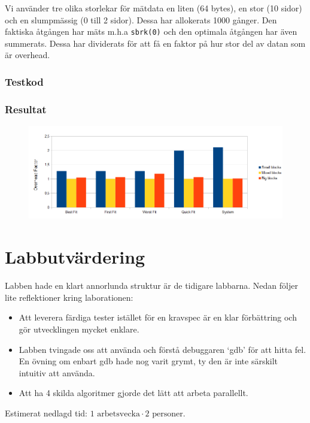 \documentclass[a4paper,10pt,titlepage]{article}
\begin{document}
Vi använder tre olika storlekar för mätdata en liten (64 bytes), en stor (10 sidor) och en slumpmässig (0 till 2 sidor). Dessa har allokerats 1000 gånger. Den faktiska åtgången har mäts m.h.a \texttt{sbrk(0)} och den optimala åtgången har även summerats. Dessa har dividerats för att få en faktor på hur stor del av datan som är overhead.

\subsubsection{Testkod}

\footnotesize{}

\subsubsection{Resultat}

\begin{figure}[H]
	\includegraphics[width=\textwidth]{overhead.png}
\end{figure}

\newpage
\section{Labbutvärdering}

Labben hade en klart annorlunda struktur är de tidigare labbarna. Nedan följer lite reflektioner kring laborationen:

\begin{itemize}
	\item Att leverera färdiga tester istället för en kravspec är en klar förbättring och gör utvecklingen mycket enklare.
	\item Labben tvingade oss att använda och förstå debuggaren `gdb' för att hitta fel. En övning om enbart gdb hade nog varit grymt, ty den är inte särskilt intuitiv att använda.
	\item Att ha 4 skilda algoritmer gjorde det lätt att arbeta parallellt.
\end{itemize}

Estimerat nedlagd tid: $1 \text{ arbetsvecka} \cdot 2 \text{ personer}$.
\end{document}
